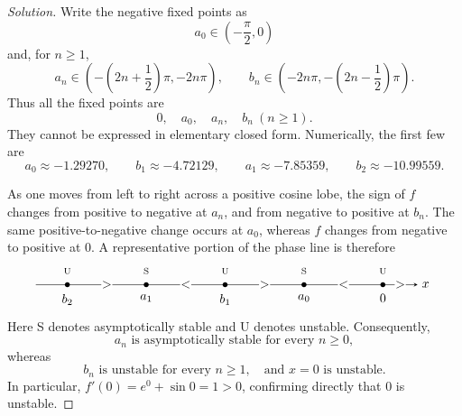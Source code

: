\documentclass[10pt]{amsart}
\newenvironment{solution}
{\begin{proof}[Solution]}
{\end{proof}}
\begin{document}
\begin{onehalfspace}
\begin{solution}
            Write the negative fixed points as
            \[
                a_0\in\left(-\frac{\pi}{2},0\right)
            \]
            and, for $n\geq1$,
            \[
                a_n\in\left(-\left(2n+\frac12\right)\pi,-2n\pi\right),
                \qquad
                b_n\in\left(-2n\pi,-\left(2n-\frac12\right)\pi\right).
            \]
            Thus all the fixed points are
            \[
                \boxed{0,\quad a_0,\quad a_n,\quad b_n\ (n\geq1).}
            \]
            They cannot be expressed in elementary closed form. Numerically, the first
            few are
            \[
                a_0\approx-1.29270,\qquad b_1\approx-4.72129,\qquad
                a_1\approx-7.85359,\qquad b_2\approx-10.99559.
            \]

            As one moves from left to right across a positive cosine lobe, the sign of
            $f$ changes from positive to negative at $a_n$, and from negative to
            positive at $b_n$. The same positive-to-negative change occurs at $a_0$,
            whereas $f$ changes from negative to positive at $0$. A representative
            portion of the phase line is therefore
            \[
                \begin{tikzpicture}[baseline=-0.5ex,>=stealth,x=0.88cm]
                  \draw[->] (-6.0,0)--(6.1,0) node[right] {$x$};
                  \foreach \x/\lab/\kind in {
                      -5/b_2/U,-2.5/a_1/S,0/b_1/U,2.5/a_0/S,5/0/U}{
                      \fill (\x,0) circle (2pt);
                      \node[below=4pt] at (\x,0) {$\lab$};
                      \node[above=5pt] at (\x,0) {\scriptsize\kind};
                  }
                  \node[fill=white,inner sep=0.5pt] at (-3.75,0) {$>$};
                  \node[fill=white,inner sep=0.5pt] at (-1.25,0) {$<$};
                  \node[fill=white,inner sep=0.5pt] at ( 1.25,0) {$>$};
                  \node[fill=white,inner sep=0.5pt] at ( 3.75,0) {$<$};
                  \node[fill=white,inner sep=0.5pt] at ( 5.55,0) {$>$};
                \end{tikzpicture}
            \]
            Here S denotes asymptotically stable and U denotes unstable. Consequently,
            \[
                \boxed{a_n\text{ is asymptotically stable for every }n\geq0,}
            \]
            whereas
            \[
                \boxed{b_n\text{ is unstable for every }n\geq1,
                    \quad\text{and }x=0\text{ is unstable}.}
            \]
            In particular, $f'(0)=e^0+\sin0=1>0$, confirming directly that $0$ is
            unstable.


\end{solution}
\end{onehalfspace}
\end{document}
